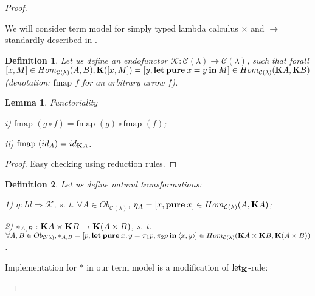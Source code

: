 \documentclass[a4paper]{article}
\newtheorem{lemma}{Lemma}
\newtheorem{defin}{Definition}
\begin{document}
\begin{proof}

$ $

We will consider term model for simply typed lambda calculus $\times$ and $\to$ standardly described in \cite{LambekScott}.

\begin{defin}
  Let us define an endofunctor $\mathcal{K} : \mathcal{C}(\lambda) \to \mathcal{C}(\lambda)$, such that
forall $[x,M] \in Hom_{\mathcal{C}(\lambda)}(A,B), {\bf K}([x,M]) = [y, {\bf let \: pure \:} x = y {\: \bf in \:} M] \in Hom_{\mathcal{C}(\lambda)}({\bf K} A, {\bf K} B)$ (denotation: $\text{fmap } f$ for an arbitrary arrow $f$).

\end{defin}

\begin{lemma} Functoriality

  i) $\text{fmap }(g \circ f) = \text{fmap }(g) \circ \text{fmap }(f)$;

  ii) $\text{fmap }(id_A) = id_{{\bf K}A}$.
\end{lemma}

\begin{proof}

Easy checking using reduction rules.

\end{proof}

\begin{defin}

  Let us define natural transformations:

  1) $\eta:Id \Rightarrow \mathcal{K}$, s. t. $\forall A \in Ob_{\mathcal{C}(\lambda)}$, $\eta_A = [x, {\bf pure \:} x] \in Hom_{\mathcal{C}(\lambda)}(A, {\bf K}A)$;

  2) $\ast_{A,B}:{\bf K}A \times {\bf K}B \to {\bf K}(A \times B)$, s. t. $\forall A, B \in Ob_{\mathcal{C}(\lambda)}, \ast_{A,B} = [p, {\bf let \: pure \:} x,y = \pi_1 p, \pi_2 p {\: \bf in \:} \langle x, y \rangle] \in Hom_{\mathcal{C}(\lambda)}({\bf K}A \times {\bf K}B, {\bf K}(A \times B))$.
\end{defin}

Implementation for $\ast$ in our term model is a modification of ${\text{let}_{\bf K}}$-rule:

\begin{prooftree}
\end{prooftree}


\end{proof}
\end{document}
